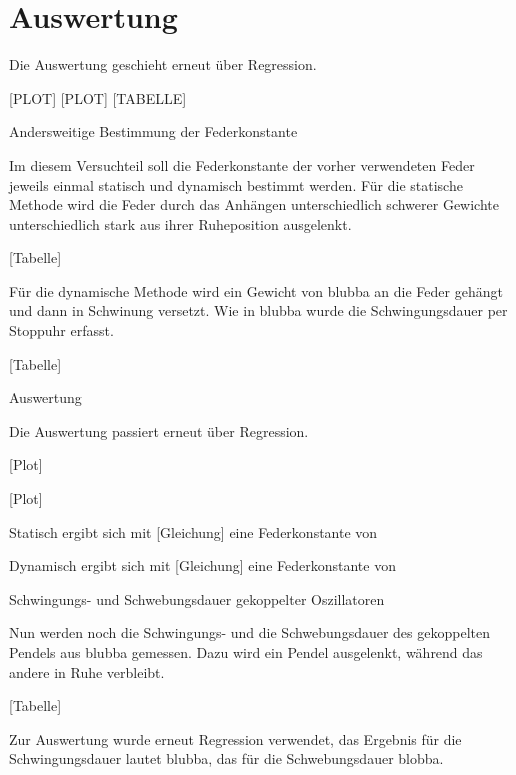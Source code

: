 \section{Auswertung}

Die Auswertung geschieht erneut über Regression.

[PLOT]
[PLOT]
[TABELLE]

Andersweitige Bestimmung der Federkonstante

Im diesem Versuchteil soll die Federkonstante der vorher verwendeten Feder jeweils einmal statisch und dynamisch bestimmt werden.
Für die statische Methode wird die Feder durch das Anhängen unterschiedlich schwerer Gewichte unterschiedlich stark aus ihrer Ruheposition ausgelenkt.

[Tabelle]

Für die dynamische Methode wird ein Gewicht von blubba an die Feder gehängt und dann in Schwinung versetzt. Wie in blubba wurde die Schwingungsdauer per Stoppuhr erfasst.

[Tabelle]

Auswertung

Die Auswertung passiert erneut über Regression.


[Plot]

[Plot]

Statisch ergibt sich mit [Gleichung] eine Federkonstante von

Dynamisch ergibt sich mit [Gleichung] eine Federkonstante von

Schwingungs- und Schwebungsdauer gekoppelter Oszillatoren

Nun werden noch die Schwingungs- und die Schwebungsdauer des gekoppelten Pendels aus blubba gemessen.
Dazu wird ein Pendel ausgelenkt, während das andere in Ruhe verbleibt.

[Tabelle]

Zur Auswertung wurde erneut Regression verwendet, das Ergebnis für die Schwingungsdauer lautet blubba, das für die Schwebungsdauer blobba.